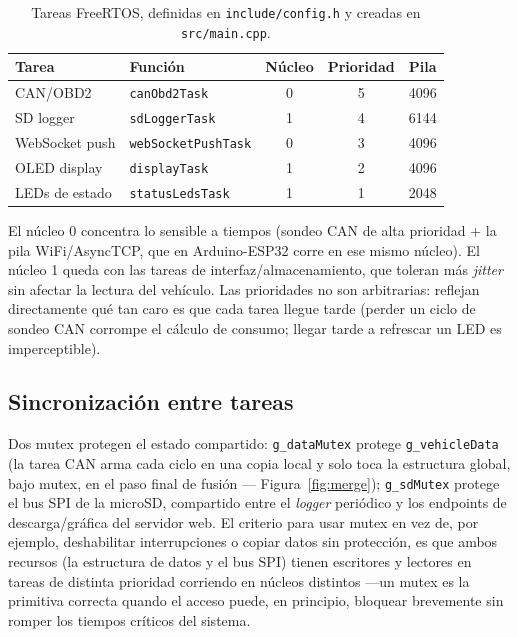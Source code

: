 \begin{table}[H]
\centering
\caption{Tareas FreeRTOS, definidas en \texttt{include/config.h} y creadas en \texttt{src/main.cpp}.}
\begin{tabular}{@{}llccc@{}}
\toprule
Tarea & Función & Núcleo & Prioridad & Pila \\
\midrule
CAN/OBD2          & \texttt{canObd2Task}       & 0 & 5 & 4096 \\
SD logger         & \texttt{sdLoggerTask}      & 1 & 4 & 6144 \\
WebSocket push     & \texttt{webSocketPushTask} & 0 & 3 & 4096 \\
OLED display      & \texttt{displayTask}       & 1 & 2 & 4096 \\
LEDs de estado    & \texttt{statusLedsTask}    & 1 & 1 & 2048 \\
\bottomrule
\end{tabular}
\end{table}

El núcleo 0 concentra lo sensible a tiempos (sondeo CAN de alta prioridad +
la pila WiFi/AsyncTCP, que en Arduino-ESP32 corre en ese mismo núcleo). El
núcleo 1 queda con las tareas de interfaz/almacenamiento, que toleran más
\textit{jitter} sin afectar la lectura del vehículo. Las prioridades no son
arbitrarias: reflejan directamente qué tan caro es que cada tarea llegue
tarde (perder un ciclo de sondeo CAN corrompe el cálculo de consumo; llegar
tarde a refrescar un LED es imperceptible).

\subsection{Sincronización entre tareas}
Dos mutex protegen el estado compartido: \texttt{g\_dataMutex} protege
\texttt{g\_vehicleData} (la tarea CAN arma cada ciclo en una copia local y
solo toca la estructura global, bajo mutex, en el paso final de fusión —
Figura~\ref{fig:merge}); \texttt{g\_sdMutex} protege el bus SPI de la
microSD, compartido entre el \textit{logger} periódico y los endpoints de
descarga/gráfica del servidor web. El criterio para usar mutex en vez de,
por ejemplo, deshabilitar interrupciones o copiar datos sin protección, es
que ambos recursos (la estructura de datos y el bus SPI) tienen escritores y
lectores en tareas de distinta prioridad corriendo en núcleos distintos —un
mutex es la primitiva correcta quando el acceso puede, en principio,
bloquear brevemente sin romper los tiempos críticos del sistema.

